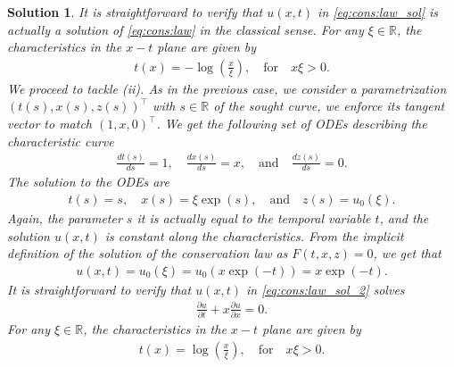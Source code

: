 \documentclass[10pt,letterpaper]{article}
\theoremstyle{break}
\newtheorem{mysolution}{Solution}
\newenvironment{solution}{\begin{mysolution}}{\end{mysolution}}
\begin{document}
\begin{solution}
	It is straightforward to verify that $u(x,t)$ in \eqref{eq:cons:law_sol}
	is actually a solution of \eqref{eq:cons:law} in the classical sense. 
	For any $\xi \in \mathbb{R}$, the characteristics in the $x-t$ plane are given by
	\begin{align}
		t(x)
		=
		-
		\log
		\left(
			\frac{x}{\xi}
		\right),
		\quad
		\text{for}
		\quad
		x \xi>0.
	\end{align}
	We proceed to tackle (ii).
	As in the previous case, we consider a parametrization
	$(t(s),x(s),z(s))^\top$ with $s \in \mathbb{R}$ of the sought curve, we enforce its tangent 
	vector to match $ (1,x,0)^\top$. We get the following set of ODEs
	describing the characteristic curve
	\begin{align}
		\frac{dt(s)}{ds} =1,
		\quad
		\frac{dx(s)}{ds} =x,
		\quad
		\text{and}
		\quad
		\frac{dz(s)}{ds} =0.
	\end{align}
	The solution to the ODEs are
	\begin{align}
		t(s) =s,
		\quad
		x(s) = \xi \exp(s),
		\quad
		\text{and}
		\quad
		z(s) = u_0(\xi).
	\end{align}
	Again, the parameter $s$ it is 
	actually equal to the temporal variable $t$, and
	the solution $u(x,t)$ is constant along the characteristics.
	From the implicit definition of the solution of the conservation law
	as $F(t,x,z) =0$, we get that 
	\begin{align}\label{eq:cons:law_sol_2}
		u(x,t) = u_0(\xi) = u_0(x \exp(-t)) = x \exp(-t).
	\end{align}
	It is straightforward to verify that $u(x,t)$ in \eqref{eq:cons:law_sol_2}
	solves
	\begin{align}
		\frac{\partial u}{\partial t}
		+
		x
		\frac{\partial u}{\partial x}
		= 0.
	\end{align}
	For any $\xi \in \mathbb{R}$, the characteristics in the $x-t$ plane are given by
	\begin{align}
		t(x)
		=
		\log
		\left(
			\frac{x}{\xi}
		\right),
		\quad
		\text{for}
		\quad
		x \xi>0.
	\end{align}
\end{solution}
\end{document}
